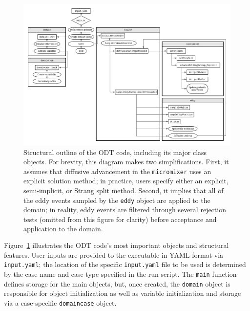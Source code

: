 \documentclass[preprint,12pt, a4paper]{elsarticle}
\begin{document}
\begin{figure}
	\centering
	\includegraphics[width=\textwidth]{../figures/odt_flow_chart/odt_flow_chart.png} 
	\caption{Structural outline of the ODT code, including its major class objects. For brevity, this diagram makes two simplifications. First, it assumes that diffusive advancement in the \texttt{micromixer} uses an explicit solution method; in practice, users specify either an explicit, semi-implicit, or Strang split method. Second, it implies that all of the eddy events sampled by the \texttt{eddy} object are applied to the domain; in reality, eddy events are filtered through several rejection tests (omitted from this figure for clarity) before acceptance and application to the domain.}
	\label{fig:flowchart}
\end{figure}

Figure~\ref{fig:flowchart} illustrates the ODT code's most important objects and structural features. User inputs are provided to the executable in YAML \cite{Beder_2008} format via \texttt{input.yaml}; the location of the specific \texttt{input.yaml} file to be used is determined by the case name and case type specified in the run script. The \texttt{main} function defines storage for the main objects, but, once created, the \texttt{domain} object is responsible for object initialization as well as variable initialization and storage via a case-specific \texttt{domaincase} object. 
\end{document}
